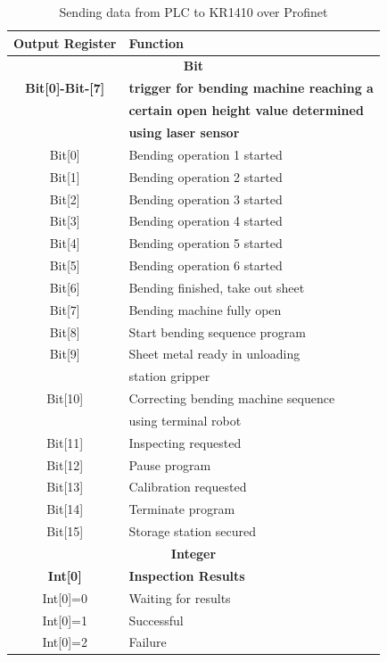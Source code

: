 \begin{table}[h!]
  \centering
  \small
  \renewcommand{\arraystretch}{1.2} %
  \begin{tabular}{c@{\hskip 2cm}l}
    \hline
      \textbf{Output Register} & \textbf{Function} \\ \hline
      \multicolumn{2}{c}{\textbf{Bit}} \\ \hline
      \textbf{Bit[0]-Bit-[7]} & \textbf{trigger for bending machine reaching a}\\
      & \textbf{certain open height value determined}\\
      & \textbf{using laser sensor} \\
      Bit[0] & Bending operation 1 started\\
      Bit[1] & Bending operation 2 started\\
      Bit[2] & Bending operation 3 started\\
      Bit[3] & Bending operation 4 started\\
      Bit[4] & Bending operation 5 started\\
      Bit[5] & Bending operation 6 started\\
      Bit[6] & Bending finished, take out sheet\\
      Bit[7] & Bending machine fully open\\
      Bit[8] & Start bending sequence program\\
      Bit[9] & Sheet metal ready in unloading\\
      & station gripper\\
      Bit[10] & Correcting bending machine sequence\\
      & using terminal robot\\
      Bit[11] & Inspecting requested\\
      Bit[12] & Pause program\\
      Bit[13] & Calibration requested\\
      Bit[14] & Terminate program\\
      Bit[15] & Storage station secured\\
      \hline
      \multicolumn{2}{c}{\textbf{Integer}} \\ \hline
      \textbf{Int[0]} & \textbf{Inspection Results}\\
      Int[0]=0 & Waiting for results\\
      Int[0]=1 & Successful\\
      Int[0]=2 & Failure\\
      \hline
  \end{tabular}
  \caption{Sending data from PLC to KR1410 over Profinet}
  \label{tab:plc-to-kr1410}
\end{table}

